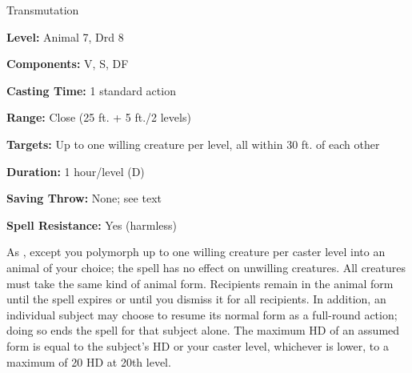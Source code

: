 
Transmutation

\textbf{Level:} Animal 7, Drd 8

\textbf{Components:} V, S, DF

\textbf{Casting Time:} 1 standard action

\textbf{Range:} Close (25 ft. + 5 ft./2 levels)

\textbf{Targets:} Up to one willing creature per level, all within 30 ft. of each 
other

\textbf{Duration:} 1 hour/level (D)

\textbf{Saving Throw:} None; see text

\textbf{Spell Resistance:} Yes (harmless)

As , except you polymorph up to one willing creature per caster 
level into an animal of your choice; the spell has no effect on unwilling creatures. 
All creatures must take the same kind of animal form. Recipients remain in the 
animal form until the spell expires or until you dismiss it for all recipients. 
In addition, an individual subject may choose to resume its normal form as a full-round 
action; doing so ends the spell for that subject alone. The maximum HD of an assumed 
form is equal to the subject's HD or your caster level, whichever is lower, to 
a maximum of 20 HD at 20th level.

